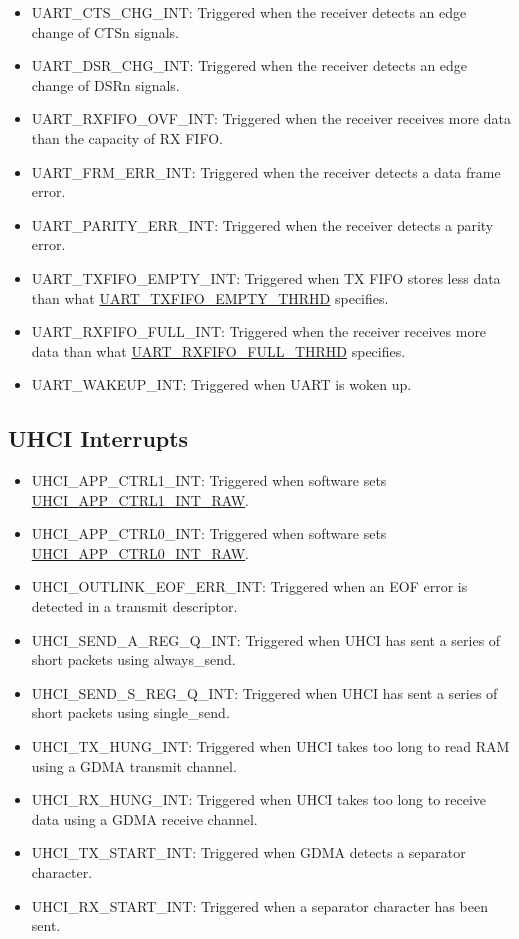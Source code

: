 \documentclass[main\_\_EN.tex]{subfiles}
\begin{document}
\begin{itemize}
\item \label{int:UARTCTSCHGINT}UART\_CTS\_CHG\_INT: Triggered when the receiver detects an edge change of CTSn signals.
\item \label{int:UARTDSRCHGINT}UART\_DSR\_CHG\_INT: Triggered when the receiver detects an edge change of DSRn signals.
\item \label{int:UARTRXFIFOOVFINT}UART\_RXFIFO\_OVF\_INT: Triggered when the receiver receives more data than the capacity of RX FIFO.
\item \label{int:UARTFRMERRINT}UART\_FRM\_ERR\_INT: Triggered when the receiver detects a data frame error. 
\item \label{int:UARTPARITYERRINT}UART\_PARITY\_ERR\_INT: Triggered when the receiver detects a parity error.
\item \label{int:UARTTXFIFOEMPTYINT}UART\_TXFIFO\_EMPTY\_INT: Triggered when TX FIFO stores less data than what \hyperref[fielddesc:UARTTXFIFOEMPTYTHRHD]{UART\_TXFIFO\_EMPTY\_THRHD} specifies.
\item \label{int:UARTRXFIFOFULLINT}UART\_RXFIFO\_FULL\_INT: Triggered when the receiver receives more data than what \hyperref[fielddesc:UARTRXFIFOFULLTHRHD]{UART\_RXFIFO\_FULL\_THRHD} specifies.
\item \label{int:UARTWAKEUPINT}UART\_WAKEUP\_INT: Triggered when UART is woken up.
\end{itemize}

\subsection{UHCI Interrupts}
\begin{itemize}
\item \label{int:UHCIAPPCTRL1INT}UHCI\_APP\_CTRL1\_INT: Triggered when software sets \hyperref[fielddesc:UHCIAPPCTRL1INTRAW]{UHCI\_APP\_CTRL1\_INT\_RAW}.
\item \label{int:UHCIAPPCTRL0INT}UHCI\_APP\_CTRL0\_INT: Triggered when software sets \hyperref[fielddesc:UHCIAPPCTRL0INTRAW]{UHCI\_APP\_CTRL0\_INT\_RAW}.
\item \label{int:UHCIOUTLINKEOFERRINT}UHCI\_OUTLINK\_EOF\_ERR\_INT: Triggered when an EOF error is detected in a transmit descriptor.
\item \label{int:UHCISENDAREGQINT}UHCI\_SEND\_A\_REG\_Q\_INT: Triggered when UHCI has sent a series of short packets using always\_send.
\item \label{int:UHCISENDSREGQINT}UHCI\_SEND\_S\_REG\_Q\_INT: Triggered when UHCI has sent a series of short packets using single\_send.
\item \label{int:UHCITXHUNGINT}UHCI\_TX\_HUNG\_INT: Triggered when UHCI takes too long to read RAM using a GDMA transmit channel.
\item \label{int:UHCIRXHUNGINT}UHCI\_RX\_HUNG\_INT: Triggered when UHCI takes too long to receive data using a GDMA receive channel.
\item \label{int:UHCITXSTARTINT}UHCI\_TX\_START\_INT: Triggered when GDMA detects a separator character.
\item \label{int:UHCIRXSTARTINT}UHCI\_RX\_START\_INT: Triggered when a separator character has been sent.
\end{itemize}
\end{document}
